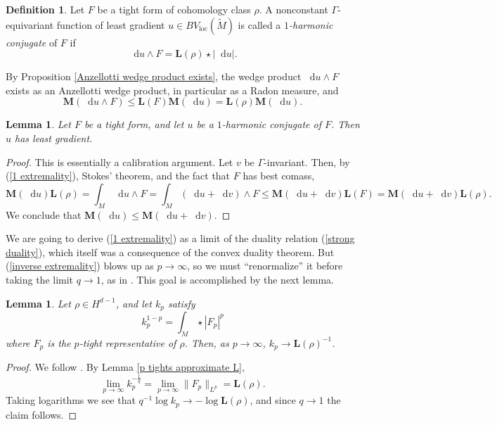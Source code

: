 \documentclass[reqno,11pt]{amsart}
\newcommand*\dif{\mathop{}\!\mathrm{d}}
\newcommand{\Mass}{\mathbf M}
\newcommand{\Comass}{\mathbf L}
\newcommand{\dfn}[1]{\emph{#1}\index{#1}}
\newcommand{\loc}{\mathrm{loc}}
\newtheorem{lemma}[theorem]{Lemma}
\theoremstyle{definition}
\newtheorem{definition}[theorem]{Definition}
\numberwithin{equation}{section}
\begin{document}
\begin{definition}
Let $F$ be a tight form of cohomology class $\rho$.
A nonconstant $\Gamma$-equivariant function of least gradient $u \in BV_\loc(\tilde M)$ is called a \dfn{$1$-harmonic conjugate} of $F$ if
\begin{equation}\label{1 extremality}
\dif u \wedge F = \Comass(\rho) \star |\dif u|.
\end{equation}
\end{definition}

By Proposition \ref{Anzellotti wedge product exists}, the wedge product $\dif u \wedge F$ exists as an Anzellotti wedge product, in particular as a Radon measure, and
$$\Mass(\dif u \wedge F) \leq \Comass(F) \Mass(\dif u) = \Comass(\rho) \Mass(\dif u).$$

\begin{lemma}\label{1 extremality implies least gradient}
Let $F$ be a tight form, and let $u$ be a $1$-harmonic conjugate of $F$.
Then $u$ has least gradient.
\end{lemma}
\begin{proof}
This is essentially a calibration argument.
Let $v$ be $\Gamma$-invariant.
Then, by (\ref{1 extremality}), Stokes' theorem, and the fact that $F$ has best comass,
$$\Mass(\dif u) \Comass(\rho) = \int_M \dif u \wedge F = \int_M (\dif u + \dif v) \wedge F \leq \Mass(\dif u + \dif v) \Comass(F) = \Mass(\dif u + \dif v) \Comass(\rho).$$
We conclude that $\Mass(\dif u) \leq \Mass(\dif u + \dif v)$.
\end{proof}

We are going to derive (\ref{1 extremality}) as a limit of the duality relation (\ref{strong duality}), which itself was a consequence of the convex duality theorem.
But (\ref{inverse extremality}) blows up as $p \to \infty$, so we must ``renormalize'' it before taking the limit $q \to 1$, as in \cite[\S3.2]{daskalopoulos2020transverse}.
This goal is accomplished by the next lemma.

\begin{lemma}\label{normalizations converge}
Let $\rho \in H^{d - 1}$, and let $k_p$ satisfy 
$$k_p^{1 - p} = \int_M \star |F_p|^p$$
where $F_p$ is the $p$-tight representative of $\rho$.
Then, as $p \to \infty$, $k_p \to \Comass(\rho)^{-1}$.
\end{lemma}
\begin{proof}
We follow \cite[Lemma 3.4]{daskalopoulos2020transverse}.
By Lemma \ref{p tights approximate L},
$$\lim_{p \to \infty} k_p^{-\frac{1}{q}} = \lim_{p \to \infty} \|F_p\|_{L^p} = \Comass(\rho).$$
Taking logarithms we see that $q^{-1} \log k_p \to -\log \Comass(\rho)$, and since $q \to 1$ the claim follows.
\end{proof}
\end{document}
